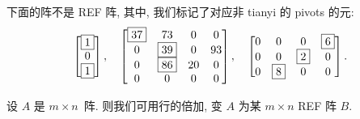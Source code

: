 \documentclass[../libro.tex]{subfiles}
\begin{document}
\begin{example}
    下面的阵不是 REF 阵, 其中,
    我们标记了对应非 tianyi 的 pivots 的元:
    \begin{equation*}
        \begin{bmatrix}
            \boxed{1} \\
            0         \\
            \boxed{1} \\
        \end{bmatrix},
        \quad
        \begin{bmatrix}
            \boxed{37} & 73         & 0  & 0  \\
            0          & \boxed{39} & 0  & 93 \\
            0          & \boxed{86} & 20 & 0  \\
            0          & 0          & 0  & 0  \\
        \end{bmatrix},
        \quad
        \begin{bmatrix}
            0 & 0         & 0         & \boxed{6} \\
            0 & 0         & \boxed{2} & 0         \\
            0 & \boxed{8} & 0         & 0         \\
        \end{bmatrix}.
        \qedhere
    \end{equation*}
\end{example}

\begin{theorem}
    设 \(A\) 是 \(m \times n\)~阵.
    则我们可用行的倍加,
    变 \(A\) 为某 \(m \times n\) REF 阵 \(B\).
\end{theorem}
\end{document}
